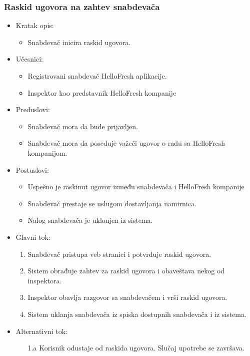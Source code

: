 \subsubsection{Raskid ugovora na zahtev snabdevača}

\begin{itemize}
    \item Kratak opis:
        \begin{itemize}
            \item Snabdevač inicira raskid ugovora.
        \end{itemize}
    \item Učesnici:
        \begin{itemize}
            \item Registrovani snabdevač HelloFresh aplikacije.
            \item Inspektor kao predstavnik HelloFresh kompanije
        \end{itemize}
    \item Preduslovi:
        \begin{itemize}
            \item Snabdevač mora da bude prijavljen.
            \item Snabdevač mora da poseduje važeći ugovor o radu sa HelloFresh kompanijom.
        \end{itemize}
    \item Postuslovi:
        \begin{itemize}
            \item Uspešno je raskinut ugovor između snabdevača i HelloFresh kompanije
            \item Snabdevač prestaje se uslugom dostavljanja namirnica.
            \item Nalog snabdevača je uklonjen iz sistema.
        \end{itemize}
    \item Glavni tok:
        \begin{enumerate}
            \item Snabdevač pristupa veb stranici i potvrđuje raskid ugovora.
            \item Sistem obrađuje zahtev za raskid ugovora i obaveštava nekog od inspektora.
            \item Inspektor obavlja razgovor sa snabdevačem i vrši raskid ugovora.
            \item Sistem uklanja snabdevača iz spiska dostupnih snabdevača i iz sistema.
        \end{enumerate}
    \item Alternativni tok:
        \begin{itemize}
            \item[1.a] Korisnik odustaje od raskida ugovora. Slučaj upotrebe se završava.
        \end{itemize}
\end{itemize}

